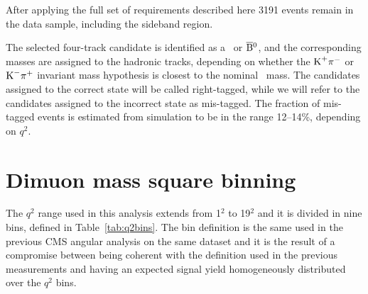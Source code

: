 After applying the full set of requirements described here 3191 events remain in the data sample, including the sideband region.

The selected four-track candidate is identified as a \PBz\ or $\overline{\textrm{B}}{}^{0}$, and the corresponding masses are assigned to the hadronic tracks, depending on whether the $\textrm{K}^{+}\pi^{-}$ or $\textrm{K}^{-}\pi^{+}$ invariant mass hypothesis is closest to the nominal \cPKstz\ mass.
The candidates assigned to the correct state will be called right-tagged, while we will refer to the candidates assigned to the incorrect state as mis-tagged.
The fraction of mis-tagged events is estimated from simulation to be in the range 12--14\%, depending on $q^2$.

\section{Dimuon mass square binning}
\label{sec:q2}


The $q^2$ range used in this analysis extends from 1\GeV$^2$ to 19\GeV$^2$ and it is divided in nine bins, defined in Table~\ref{tab:q2bins}.
The bin definition is the same used in the previous CMS angular analysis on the same dataset and it is the result of a compromise between being coherent with the definition used in the previous measurements and having an expected signal yield homogeneously distributed over the $q^2$ bins.

